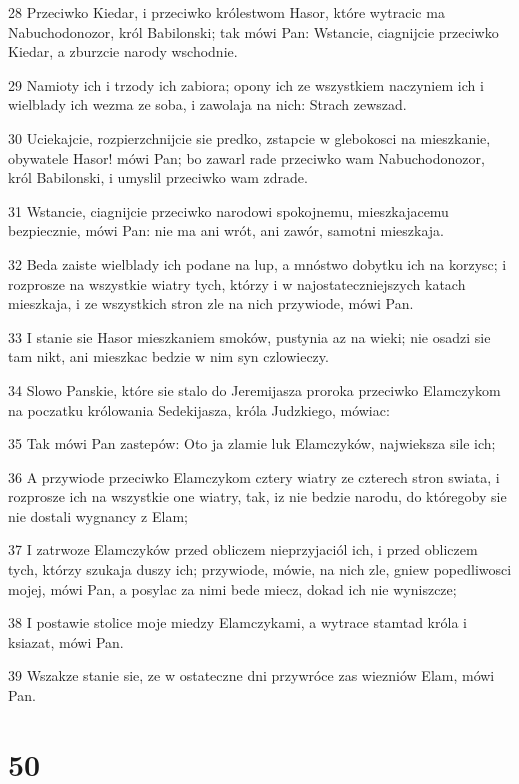 \par 28 Przeciwko Kiedar, i przeciwko królestwom Hasor, które wytracic ma Nabuchodonozor, król Babilonski; tak mówi Pan: Wstancie, ciagnijcie przeciwko Kiedar, a zburzcie narody wschodnie.
\par 29 Namioty ich i trzody ich zabiora; opony ich ze wszystkiem naczyniem ich i wielblady ich wezma ze soba, i zawolaja na nich: Strach zewszad.
\par 30 Uciekajcie, rozpierzchnijcie sie predko, zstapcie w glebokosci na mieszkanie, obywatele Hasor! mówi Pan; bo zawarl rade przeciwko wam Nabuchodonozor, król Babilonski, i umyslil przeciwko wam zdrade.
\par 31 Wstancie, ciagnijcie przeciwko narodowi spokojnemu, mieszkajacemu bezpiecznie, mówi Pan: nie ma ani wrót, ani zawór, samotni mieszkaja.
\par 32 Beda zaiste wielblady ich podane na lup, a mnóstwo dobytku ich na korzysc; i rozprosze na wszystkie wiatry tych, którzy i w najostateczniejszych katach mieszkaja, i ze wszystkich stron zle na nich przywiode, mówi Pan.
\par 33 I stanie sie Hasor mieszkaniem smoków, pustynia az na wieki; nie osadzi sie tam nikt, ani mieszkac bedzie w nim syn czlowieczy.
\par 34 Slowo Panskie, które sie stalo do Jeremijasza proroka przeciwko Elamczykom na poczatku królowania Sedekijasza, króla Judzkiego, mówiac:
\par 35 Tak mówi Pan zastepów: Oto ja zlamie luk Elamczyków, najwieksza sile ich;
\par 36 A przywiode przeciwko Elamczykom cztery wiatry ze czterech stron swiata, i rozprosze ich na wszystkie one wiatry, tak, iz nie bedzie narodu, do któregoby sie nie dostali wygnancy z Elam;
\par 37 I zatrwoze Elamczyków przed obliczem nieprzyjaciól ich, i przed obliczem tych, którzy szukaja duszy ich; przywiode, mówie, na nich zle, gniew popedliwosci mojej, mówi Pan, a posylac za nimi bede miecz, dokad ich nie wyniszcze;
\par 38 I postawie stolice moje miedzy Elamczykami, a wytrace stamtad króla i ksiazat, mówi Pan.
\par 39 Wszakze stanie sie, ze w ostateczne dni przywróce zas wiezniów Elam, mówi Pan.

\chapter{50}

